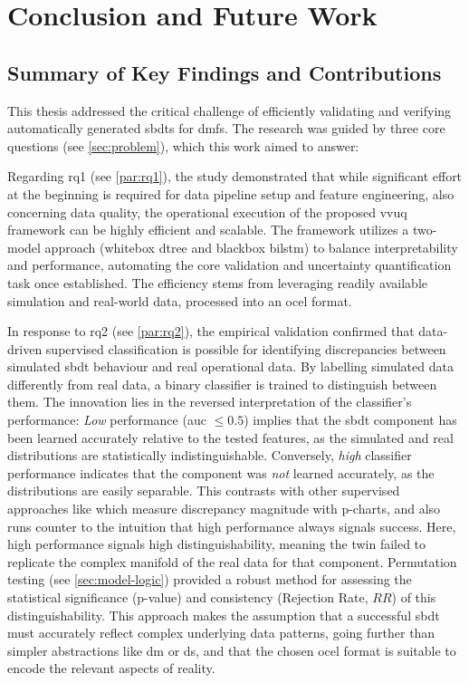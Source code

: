 \chapter{Conclusion and Future Work}
\label{chap:conclusion}

\section{Summary of Key Findings and Contributions}
\label{sec:conclusion_summary_findings}

This thesis addressed the critical challenge of efficiently validating and verifying automatically generated \gls{sbdt}s for \gls{dmfs}. The research was guided by three core questions (see \autoref{sec:problem}), which this work aimed to answer:

Regarding \gls{rq}1 (see \autoref{par:rq1}), the study demonstrated that while significant effort at the beginning is required for data pipeline setup and feature engineering, also concerning data quality, the operational execution of the proposed \gls{vvuq} framework can be highly efficient and scalable. The framework utilizes a two-model approach (whitebox \gls{dtree} and blackbox \gls{bilstm}) to balance interpretability and performance, automating the core validation and uncertainty quantification task once established. The efficiency stems from leveraging readily available simulation and real-world data, processed into an \gls{ocel} format.

In response to \gls{rq}2 (see \autoref{par:rq2}), the empirical validation confirmed that data-driven supervised classification is possible for identifying discrepancies between simulated \gls{sbdt} behaviour and real operational data. By labelling simulated data differently from real data, a binary classifier is trained to distinguish between them. The innovation lies in the reversed interpretation of the classifier's performance: \textit{Low} performance (\gls{auc} $\le 0.5$) implies that the \gls{sbdt} component has been learned accurately relative to the tested features, as the simulated and real distributions are statistically indistinguishable. Conversely, \textit{high} classifier performance indicates that the component was \textit{not} learned accurately, as the distributions are easily separable. This contrasts with other supervised approaches like \textcite{dos2024digital} which measure discrepancy magnitude with p-charts, and also runs counter to the intuition that high performance always signals success. Here, high performance signals high distinguishability, meaning the twin failed to replicate the complex manifold of the real data for that component. Permutation testing (see \autoref{sec:model-logic}) provided a robust method for assessing the statistical significance (p-value) and consistency (Rejection Rate, $RR$) of this distinguishability. This approach makes the assumption that a successful \gls{sbdt} must accurately reflect complex underlying data patterns, going further than simpler abstractions like \gls{dm} or \gls{ds}, and that the chosen \gls{ocel} format is suitable to encode the relevant aspects of reality.


